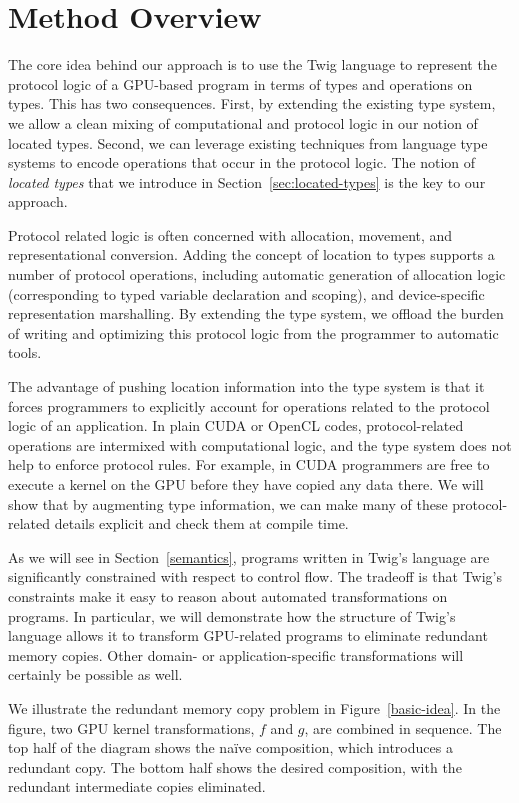 
\section{Method Overview}

The core idea behind our approach is to use the Twig language to represent the
protocol logic of a GPU-based program in terms of types and operations on types.
This has two consequences. First, by extending the existing type system, we
allow a clean mixing of computational and protocol logic in our notion of
located types. Second, we can leverage existing techniques from language type
systems to encode operations that occur in the protocol logic. The notion of
\emph{located types} that we introduce in Section~\ref{sec:located-types} is the
key to our approach.

Protocol related logic is often concerned with allocation, movement, and
representational conversion. Adding the concept of location to types supports a
number of protocol operations, including automatic generation of allocation
logic (corresponding to typed variable declaration and scoping), and
device-specific representation marshalling. By extending the type system, we
offload the burden of writing and optimizing this protocol logic from the
programmer to automatic tools.

The advantage of pushing location information into the type system is that it
forces programmers to explicitly account for operations related to the protocol
logic of an application. In plain CUDA or OpenCL codes, protocol-related
operations are intermixed with computational logic, and the type system does not
help to enforce protocol rules. For example, in CUDA programmers are free to
execute a kernel on the GPU before they have copied any data there. We will show
that by augmenting type information, we can make many of these protocol-related
details explicit and check them at compile time.

As we will see in Section~\ref{semantics}, programs written in Twig's language
are significantly constrained with respect to control flow. The tradeoff is that
Twig's constraints make it easy to reason about automated transformations on
programs. In particular, we will demonstrate how the structure of Twig's
language allows it to transform GPU-related programs to eliminate redundant
memory copies. Other domain- or application-specific transformations will
certainly be possible as well.

We illustrate the redundant memory copy problem in Figure~\ref{basic-idea}. In
the figure, two GPU kernel transformations, $f$ and $g$, are combined in
sequence. The top half of the diagram shows the na\"ive composition, which
introduces a redundant copy. The bottom half shows the desired composition, with
the redundant intermediate copies eliminated.

